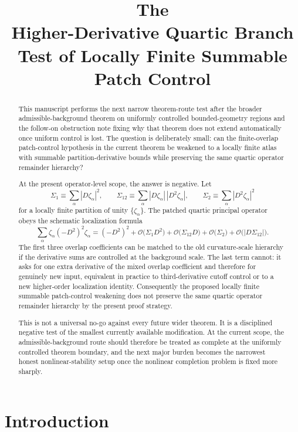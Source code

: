 \documentclass[11pt]{article}
\title{\textbf{The \TheoryName{}}\\[0.4em]
\large Higher-Derivative Quartic Branch Test of Locally Finite Summable Patch Control}
\author{}
\date{}
\begin{document}
\maketitle

\begin{abstract}
This manuscript performs the next narrow theorem-route test after the broader admissible-background theorem on uniformly controlled bounded-geometry regions and the follow-on obstruction note fixing why that theorem does not extend automatically once uniform control is lost. The question is deliberately small: can the finite-overlap patch-control hypothesis in the current theorem be weakened to a locally finite atlas with summable partition-derivative bounds while preserving the same quartic operator remainder hierarchy?

At the present operator-level scope, the answer is negative. Let
\[
\Sigma_1\equiv \sum_\alpha |D\zeta_\alpha|^2,
\qquad
\Sigma_{12}\equiv \sum_\alpha |D\zeta_\alpha|\,|D^2\zeta_\alpha|,
\qquad
\Sigma_2\equiv \sum_\alpha |D^2\zeta_\alpha|^2
\]
for a locally finite partition of unity \(\{\zeta_\alpha\}\). The patched quartic principal operator obeys the schematic localization formula
\[
\sum_\alpha \zeta_\alpha (-D^2)^2 \zeta_\alpha
=
(-D^2)^2
+ \mathcal O\!\bigl(\Sigma_1 D^2\bigr)
+ \mathcal O\!\bigl(\Sigma_{12} D\bigr)
+ \mathcal O\!\bigl(\Sigma_2\bigr)
+ \mathcal O\!\bigl(|D\Sigma_{12}|\bigr).
\]
The first three overlap coefficients can be matched to the old curvature-scale hierarchy if the derivative sums are controlled at the background scale. The last term cannot: it asks for one extra derivative of the mixed overlap coefficient and therefore for genuinely new input, equivalent in practice to third-derivative cutoff control or to a new higher-order localization identity. Consequently the proposed locally finite summable patch-control weakening does not preserve the same quartic operator remainder hierarchy by the present proof strategy.

This is not a universal no-go against every future wider theorem. It is a disciplined negative test of the smallest currently available modification. At the current scope, the admissible-background route should therefore be treated as complete at the uniformly controlled theorem boundary, and the next major burden becomes the narrowest honest nonlinear-stability setup once the nonlinear completion problem is fixed more sharply.
\end{abstract}

\section{Introduction}
\end{document}
